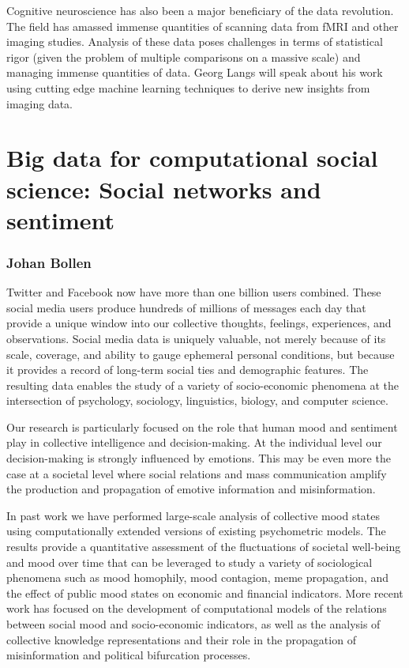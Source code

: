 \documentclass[10pt,letterpaper]{article}
\begin{document}
Cognitive neuroscience has also been a major beneficiary of the data revolution.
The field has amassed immense quantities of scanning data from fMRI and other
imaging studies.  Analysis of these data poses challenges in terms of statistical
rigor (given the problem of multiple comparisons on a massive scale) and managing
immense quantities of data. Georg Langs will speak about his work using cutting
edge machine learning techniques to derive new insights from imaging data.


\section{Big data for computational social science: Social networks and sentiment}
\subsubsection{Johan Bollen}

Twitter and Facebook now have more than one billion users combined. These social media
users produce hundreds of millions of messages each day that provide a unique window into
our collective thoughts, feelings, experiences, and observations. Social media data is
uniquely valuable, not merely because of its scale, coverage, and ability to gauge
ephemeral personal conditions, but because it provides a record of long-term social ties
and demographic features. The resulting data enables the study of a variety of
socio-economic phenomena at the intersection of psychology, sociology, linguistics,
biology, and computer science.

Our research is particularly focused on the role that human mood and sentiment play in
collective intelligence and decision-making. At the individual level our decision-making
is strongly influenced by emotions. This may be even more the case at a societal level
where social relations and mass communication amplify the production and propagation of
emotive information and misinformation.

In past work we have performed large-scale analysis of collective mood states using
computationally extended versions of existing psychometric models. The results provide a
quantitative assessment of the fluctuations of societal well-being and mood over time that
can be leveraged to study a variety of sociological phenomena such as mood homophily, mood
contagion, meme propagation, and the effect of public mood states on economic and
financial indicators. More recent work has focused on the development of computational
models of the relations between social mood and socio-economic indicators, as well as the
analysis of collective knowledge representations and their role in the propagation of
misinformation and political bifurcation processes.
\end{document}
